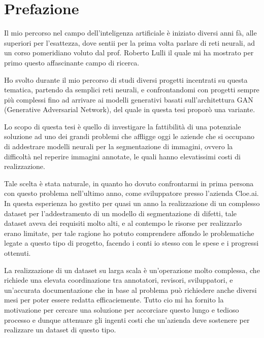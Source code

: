 \clearpage
\phantom{a}
\vfill


\chapter{Prefazione \ok \ok \ok}


\begin{flushleft}


\begin{comment}



\end{comment}


Il mio percorso nel campo dell'inteligenza artificiale è iniziato diversi anni fà, alle superiori per l'esattezza,
dove sentii per la prima volta parlare di reti neurali, ad un corso pomeridiano voluto dal prof. Roberto Lulli il quale mi ha mostrato per primo questo affascinante campo di ricerca.

Ho svolto durante il mio percorso di studi diversi progetti incentrati su questa tematica, partendo da semplici reti neurali,
e confrontandomi con progetti sempre più complessi fino ad arrivare ai modelli generativi basati sull'architettura GAN (Generative Adversarial Network),
del quale in questa tesi proporò una variante.

Lo scopo di questa tesi è quello di investigare la fattibilità di una potenziale soluzione ad uno dei grandi problemi che affligge oggi le aziende che si occupano di addestrare modelli neurali per la segmentazione di immagini,
ovvero la difficoltà nel reperire immagini annotate, le quali hanno elevatissimi costi di realizzazione.

Tale scelta è stata naturale, in quanto ho dovuto confrontarmi in prima persona con questo problema nell'ultimo anno, come sviluppatore presso l'azienda Cloe.ai.
In questa esperienza ho gestito per quasi un anno la realizzazione di un complesso dataset per l'addestramento di un modello di segmentazione di difetti, 
tale dataset aveva dei requisiti molto alti, e al contempo le risorse per realizzarlo erano limitate, per tale ragione ho potuto comprendere affondo le problematiche legate a questo tipo di progetto, 
facendo i conti io stesso con le spese e i progressi ottenuti.

La realizzazione di un dataset su larga scala è un'operazione molto complessa, che richiede una elevata coordinazione tra annotatori, revisori, sviluppatori,
 e un'accurata documentazione che in base al problema può richiedere anche diversi mesi per poter essere redatta efficaciemente.
Tutto cio mi ha fornito la motivazione per cercare una soluzione per accorciare questo lungo e tedioso processo e dunque attenuare
gli ingenti costi che un'azienda deve sostenere per realizzare un dataset di questo tipo. 

\end{flushleft}



\vfill
\newpage